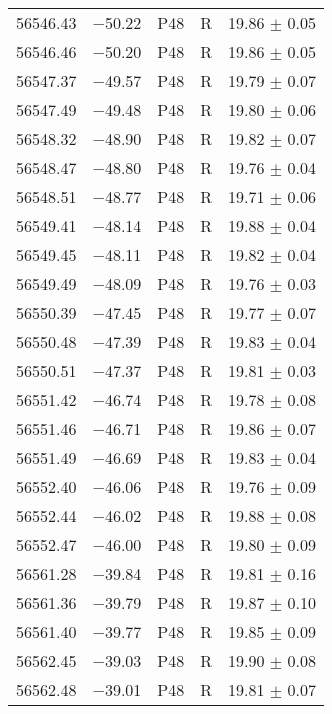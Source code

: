 \begin{tabular}{crccc}
    56546.43  &$-$50.22  &       P48  &   R  &     19.86 $\pm$ 0.05 \\
    56546.46  &$-$50.20  &       P48  &   R  &     19.86 $\pm$ 0.05 \\
    56547.37  &$-$49.57  &       P48  &   R  &     19.79 $\pm$ 0.07 \\
    56547.49  &$-$49.48  &       P48  &   R  &     19.80 $\pm$ 0.06 \\
    56548.32  &$-$48.90  &       P48  &   R  &     19.82 $\pm$ 0.07 \\
    56548.47  &$-$48.80  &       P48  &   R  &     19.76 $\pm$ 0.04 \\
    56548.51  &$-$48.77  &       P48  &   R  &     19.71 $\pm$ 0.06 \\
    56549.41  &$-$48.14  &       P48  &   R  &     19.88 $\pm$ 0.04 \\
    56549.45  &$-$48.11  &       P48  &   R  &     19.82 $\pm$ 0.04 \\
    56549.49  &$-$48.09  &       P48  &   R  &     19.76 $\pm$ 0.03 \\
    56550.39  &$-$47.45  &       P48  &   R  &     19.77 $\pm$ 0.07 \\
    56550.48  &$-$47.39  &       P48  &   R  &     19.83 $\pm$ 0.04 \\
    56550.51  &$-$47.37  &       P48  &   R  &     19.81 $\pm$ 0.03 \\
    56551.42  &$-$46.74  &       P48  &   R  &     19.78 $\pm$ 0.08 \\
    56551.46  &$-$46.71  &       P48  &   R  &     19.86 $\pm$ 0.07 \\
    56551.49  &$-$46.69  &       P48  &   R  &     19.83 $\pm$ 0.04 \\
    56552.40  &$-$46.06  &       P48  &   R  &     19.76 $\pm$ 0.09 \\
    56552.44  &$-$46.02  &       P48  &   R  &     19.88 $\pm$ 0.08 \\
    56552.47  &$-$46.00  &       P48  &   R  &     19.80 $\pm$ 0.09 \\
    56561.28  &$-$39.84  &       P48  &   R  &     19.81 $\pm$ 0.16 \\
    56561.36  &$-$39.79  &       P48  &   R  &     19.87 $\pm$ 0.10 \\
    56561.40  &$-$39.77  &       P48  &   R  &     19.85 $\pm$ 0.09 \\
    56562.45  &$-$39.03  &       P48  &   R  &     19.90 $\pm$ 0.08 \\
    56562.48  &$-$39.01  &       P48  &   R  &     19.81 $\pm$ 0.07 \\

\end{tabular}
